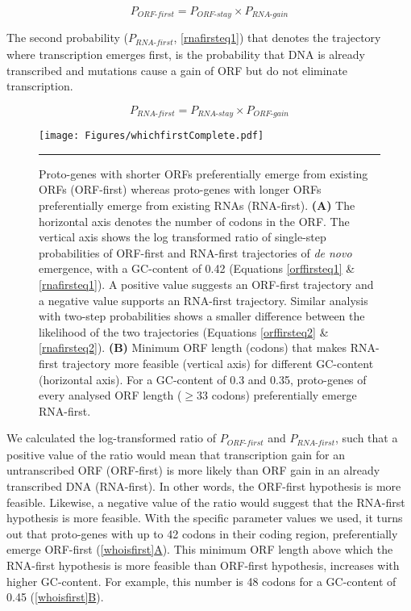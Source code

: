 \documentclass[12pt,a4paper]{article}
\begin{document}
\begin{equation}
P_\textit{ORF-first} = P_\textit{ORF-stay}\times P_\textit{RNA-gain}
\label{orffirsteq1}
\end{equation}

The second probability ($P_\textit{RNA-first}$, \autoref{rnafirsteq1}) that denotes the trajectory where transcription emerges first, is the probability that DNA is already transcribed and mutations cause a gain of ORF but do not eliminate transcription. 

\begin{equation}
P_\textit{RNA-first} = P_\textit{RNA-stay}\times P_\textit{ORF-gain}
\label{rnafirsteq1}
\end{equation}

\begin{figure}[!t]
\centering
\texttt{[image: Figures/whichfirstComplete.pdf]}
\caption{Proto-genes with shorter ORFs preferentially emerge from existing ORFs (ORF-first) whereas proto-genes with longer ORFs preferentially emerge from existing RNAs (RNA-first). \textbf{(A)} The horizontal axis denotes the number of codons in the ORF. The vertical axis shows the log transformed ratio of single-step probabilities of ORF-first and RNA-first trajectories of \textit{de novo} emergence, with a GC-content of 0.42 (Equations \ref{orffirsteq1} \& \ref{rnafirsteq1}). A positive value suggests an ORF-first trajectory and a negative value supports an RNA-first trajectory. Similar analysis with two-step probabilities shows a smaller difference between the likelihood of the two trajectories (Equations \ref{orffirsteq2} \& \ref{rnafirsteq2}). \textbf{(B)} Minimum ORF length (codons) that makes RNA-first trajectory more feasible (vertical axis) for different GC-content (horizontal axis). For a GC-content of 0.3 and 0.35, proto-genes of every analysed ORF length ($\geq33$ codons) preferentially emerge RNA-first.}
\label{whoisfirst}
\vspace{1ex}
\hrule
\end{figure}
We calculated the log-transformed ratio of $P_\textit{ORF-first}$ and $P_\textit{RNA-first}$, such that a positive value of the ratio would mean that transcription gain for an untranscribed ORF (ORF-first) is more likely than ORF gain in an already transcribed DNA (RNA-first). In other words, the ORF-first hypothesis is more feasible. Likewise, a negative value of the ratio would suggest that the RNA-first hypothesis is more feasible. With the specific parameter values we used, it turns out that proto-genes with up to 42 codons in their coding region, preferentially emerge ORF-first (\hyperref[whoisfirst]{\autoref{whoisfirst}A}). This minimum ORF length above which the RNA-first hypothesis is more feasible than ORF-first hypothesis, increases with higher GC-content. For example, this number is 48 codons for a GC-content of 0.45 (\hyperref[whoisfirst]{\autoref{whoisfirst}B}).
\end{document}
